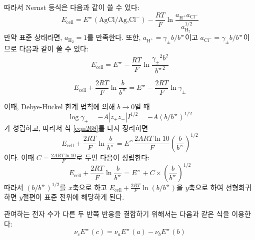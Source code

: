         따라서 Nernst 등식은 다음과 같이 쓸 수 있다:
        \begin{equation*}
            E_\mathrm{cell}=E^\circlehbar\left(\text{AgCl/Ag,Cl}^{-}\right)-\frac{RT}{F}\ln{\frac{a_{\mathrm{H^+}}a_{\mathrm{Cl^-}}}{a_\mathrm{H_2}^{1/2}}}
        \end{equation*}
        만약 표준 상태라면, $a_\mathrm{H_2}=1$를 만족한다. 또한, $a_\mathrm{H^+}=\gamma_\pm b/b^\circlehbar$이고 
        $a_\mathrm{Cl^-}=\gamma_\pm b/b^\circlehbar$이므로 다음과 같이 쓸 수 있다:
        \begin{equation*}
            E_\mathrm{cell}=E^\circlehbar-\frac{RT}{F}\ln{\frac{{\gamma_\pm}^2 b^2}{{b^\circlehbar}^2}}
        \end{equation*}
        \begin{obs}\label{eqn268}
        \begin{equation*}
            E_\text{cell}+\frac{2RT}{F}\ln{\frac{b}{b^\circlehbar}}=E^\circlehbar-\frac{2RT}{F}\ln{\gamma_\pm}
        \end{equation*}
        \end{obs}
        이때, Debye-Hückel 한계 법칙에 의해 $b\rightarrow 0$일 때
        \begin{equation*}
            \log{\gamma_\pm}=-A\left\vert z_+ z_-\right\vert I^{1/2}=-A\left(b/b^\circlehbar\right)^{1/2}
        \end{equation*}
        가 성립하고, 따라서 식 \ref{eqn268}를 다시 정리하면
        \begin{equation*}
            E_\text{cell}+\frac{2RT}{F}\ln{\frac{b}{b^\circlehbar}}=E^\circlehbar\frac{2ART\ln{10}}{F}\left(\frac{b}{b^\circlehbar}\right)^{1/2}
        \end{equation*}
        이다. 이때 $\displaystyle C=\frac{2ART\ln{10}}{F}$로 두면 다음이 성립한다:
        \begin{equation*}
            E_\text{cell}+\frac{2RT}{F}\ln{\frac{b}{b^\circlehbar}}=E^\circlehbar + C\times\left(\frac{b}{b^\circlehbar}\right)^{1/2}
        \end{equation*}
        따라서 $\left(b/b^\circlehbar\right)^{1/2}$를 $x$축으로 하고 $E_\text{cell}+\frac{2RT}{F}\ln{\left(b/b^\circlehbar\right)}$을 $y$축으로 하여 선형회귀하면 $y$절편이 표준 전위에 해당하게 된다.
        \par 관여하는 전자 수가 다른 두 반쪽 반응을 결합하기 위해서는 다음과 같은 식을 이용한다:
        \begin{equation*}
            \nu_c E^\circlehbar\left(c\right)=\nu_a E^\circlehbar\left(a\right) - \nu_b E^\circlehbar\left(b\right)
        \end{equation*}
